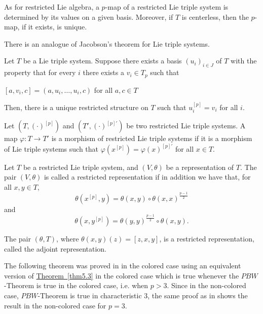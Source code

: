 \documentclass[11pt, twoside]{article}
\begin{document}
\begin{rmq}
    As for restricted Lie algebra, a $p$-map of a restricted Lie triple system is determined by its values on a given basis. Moreover, if $T$ is centerless, then the $p$-map, if it exists, is unique.
\end{rmq}

There is an analogue of Jacobson's theorem for Lie triple systems.

\begin{thm}[\cite{HP02}]\label{thm5.3}
    Let $T$ be a Lie triple system. Suppose there exists a basis $(u_{i})_{i\in J}$  of $T$ with the property that for every $i$ there exists a $v_{i}\in T_{p} $ such that \begin{center}
        $[a,v_{i},c]= (a,u_{i},\dots,u_{i},c) $ for all $a,c\in T$
    \end{center} Then, there is a unique restricted structure on $T$ such that $u_{i}^{[p]}=v_{i} $ for all $i$.
    
\end{thm}

\begin{defi}
    Let $(T,(\cdot)^{[p]})$ and $ (T',(\cdot)^{[p]'}) $ be two restricted Lie triple systems. A map $\varphi: T\to T'$ is a morphism of restricted Lie triple systems if it is a morphism of Lie triple systems such that $\varphi(x^{[p]})= \varphi(x)^{[p]'}$ for all $x\in T$.
\end{defi}

\begin{defi}[\cite{BM26}]
    Let $T$ be a restricted Lie triple system, and $(V,\theta)$ be a representation of $T$. The pair $(V,\theta)$ is called a restricted representation if in addition we have that, for all $x,y\in T  $,  
    \begin{equation*}
    \theta(x^{[p]},y)=\theta(x,y) \circ \theta(x,x)^{\frac{p-1}{2}} 
    \end{equation*}  and 
    \begin{equation*} \theta(x,y^{[p]})= \theta(y,y)^{\frac{p-1}{2}}\circ\theta(x,y) .   \end{equation*} 
\end{defi}

\begin{ex}
    The pair $(\theta,T)$, where $\theta(x,y)(z)=[z,x,y] $, is a restricted representation, called the adjoint representation.
\end{ex}

The following  theorem was proved in \cite{BM26} in the colored case using an equivalent version of  \hyperref[thm5.3]{Theorem~\ref*{thm5.3}} in the colored case which is true whenever the $PBW$-Theorem is true in the colored case, i.e. when $p>3$. Since in the non-colored case, $PBW$-Theorem is true in characteristic $3$, the same proof as in \cite{BM26} shows the result in the non-colored case for $p=3$.
\end{document}
